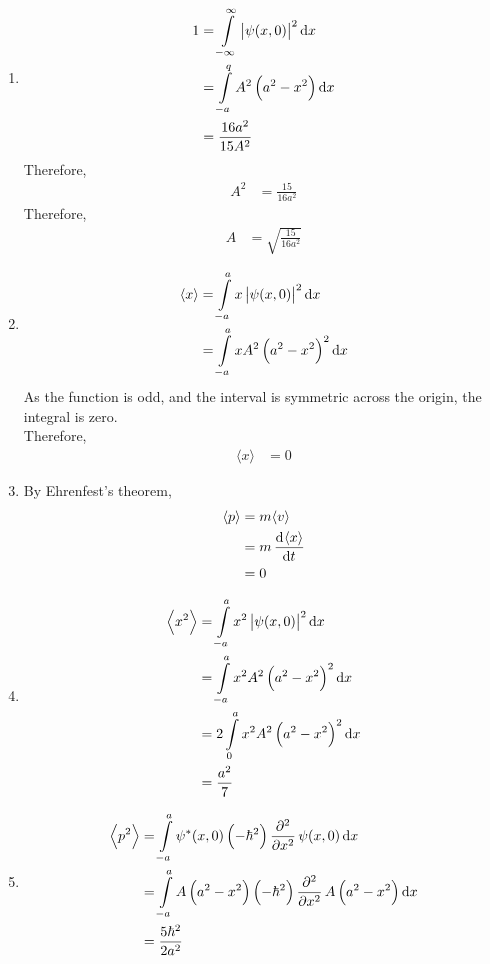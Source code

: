 \documentclass[fleqn, a4paper, 11pt, oneside]{amsart}
\theoremstyle{definition}
\theoremstyle{theorem}
\begin{document}
\begin{solution}
	\begin{enumerate}[leftmargin=*]
		\item
			\begin{align*}
				1 & = \int\limits_{-\infty}^{\infty} \left| \psi(x,0) \right|^2 \dif x\\
				&=\int\limits_{-a}^{q} A^2 \left( a^2 - x^2 \right) \dif x\\
				&= \frac{16 a^2}{15 A^2}
			\end{align*}
			Therefore,
			\begin{align*}
				A^2 &= \frac{15}{16 a^2}
			\end{align*}
			Therefore,
			\begin{align*}
				A &= \sqrt{\frac{15}{16 a^2}}
			\end{align*}
		\item
			\begin{align*}
				\langle x \rangle &= \int\limits_{-a}^{a} x \left| \psi(x,0) \right|^2 \dif x\\
				&= \int\limits_{-a}^{a} x A^2 \left( a^2 - x^2 \right)^2 \dif x
			\end{align*}
			As the function is odd, and the interval is symmetric across the origin, the integral is zero.\\
			Therefore,
			\begin{align*}
				\langle x \rangle &= 0
			\end{align*}
		\item
			By Ehrenfest's theorem,
			\begin{align*}
				\langle p \rangle &= m \langle v \rangle\\
				&= m \dod{\langle x \rangle}{t}\\
				&= 0
			\end{align*}
		\item
			\begin{align*}
				\left\langle x^2 \right\rangle &= \int\limits_{-a}^{a} x^2 \left| \psi(x,0) \right|^2 \dif x\\
				&= \int\limits_{-a}^{a} x^2 A^2 \left( a^2 - x^2 \right)^2 \dif x\\
				&= 2 \int\limits_{0}^{a} x^2 A^2 \left( a^2 - x^2 \right)^2 \dif x\\
				&= \frac{a^2}{7}
			\end{align*}
		\item
			\begin{align*}
				\left\langle p^2 \right\rangle &= \int\limits_{-a}^{a} \psi^*(x,0) \left( -\hbar^2 \right) \dpd[2]{}{x} \psi(x,0) \dif x\\
				&= \int\limits_{-a}^{a} A \left( a^2 - x^2 \right) \left( -\hbar^2 \right) \dpd[2]{}{x} A \left( a^2 - x^2 \right) \dif x\\
				&= \frac{5 \hbar^2}{2 a^2}
			\end{align*}
	\end{enumerate}
\end{solution}
\end{document}
